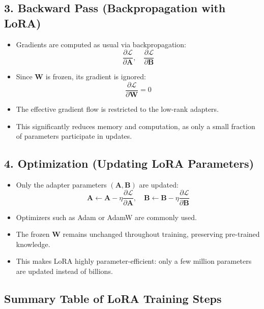 \documentclass[a4paper, 12pt]{article}
\begin{document}
\subsection*{3. Backward Pass (Backpropagation with LoRA)}

\begin{itemize}
    \item Gradients are computed as usual via backpropagation:
    \[
        \frac{\partial \mathcal{L}}{\partial \mathbf{A}}, \quad \frac{\partial \mathcal{L}}{\partial \mathbf{B}}
    \]
    \item Since $\mathbf{W}$ is frozen, its gradient is ignored:
    \[
        \frac{\partial \mathcal{L}}{\partial \mathbf{W}} = 0
    \]
    \item The effective gradient flow is restricted to the low-rank adapters.
    \item This significantly reduces memory and computation, as only a small fraction of parameters participate in updates.
\end{itemize}

\subsection*{4. Optimization (Updating LoRA Parameters)}

\begin{itemize}
    \item Only the adapter parameters $(\mathbf{A}, \mathbf{B})$ are updated:
    \[
        \mathbf{A} \leftarrow \mathbf{A} - \eta \frac{\partial \mathcal{L}}{\partial \mathbf{A}}, \quad
        \mathbf{B} \leftarrow \mathbf{B} - \eta \frac{\partial \mathcal{L}}{\partial \mathbf{B}}
    \]
    \item Optimizers such as Adam or AdamW are commonly used.
    \item The frozen $\mathbf{W}$ remains unchanged throughout training, preserving pre-trained knowledge.
    \item This makes LoRA highly parameter-efficient: only a few million parameters are updated instead of billions.
\end{itemize}

\subsection*{Summary Table of LoRA Training Steps}
\end{document}
